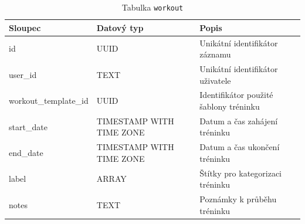 \begin{table}[ht!]
    \centering
    \begin{tabularx}{\textwidth}{|l|l|L|}
        \hline
        \textbf{Sloupec}      & \textbf{Datový typ}      & \textbf{Popis}                         \\ \hline
        id                    & UUID                     & Unikátní identifikátor záznamu         \\ \hline
        user\_id              & TEXT                     & Unikátní identifikátor uživatele       \\ \hline
        workout\_template\_id & UUID                     & Identifikátor použité šablony tréninku \\ \hline
        start\_date           & TIMESTAMP WITH TIME ZONE & Datum a čas zahájení tréninku          \\ \hline
        end\_date             & TIMESTAMP WITH TIME ZONE & Datum a čas ukončení tréninku          \\ \hline
        label                 & ARRAY                    & Štítky pro kategorizaci tréninku       \\ \hline
        notes                 & TEXT                     & Poznámky k průběhu tréninku            \\ \hline
    \end{tabularx}
    \caption{Tabulka \texttt{workout}}
    \label{tab:workout}
\end{table}
